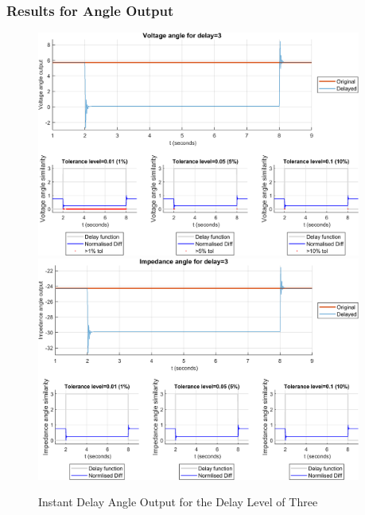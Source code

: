\subsubsection{Results for Angle Output}


\begin{figure}
    \caption{Instant Delay Angle Output for the Delay Level of Three}
    \includegraphics[width=0.95\textwidth]{PMUsim-figures/DelayOf_3/Instant_vAngle.png}    
    \includegraphics[width=0.95\textwidth]{PMUsim-figures/DelayOf_3/Instant_iAngle.png}    
    \label{fig:PMUsim_Three_Angle}
        \begin{small}
     \end{small}
\end{figure}


